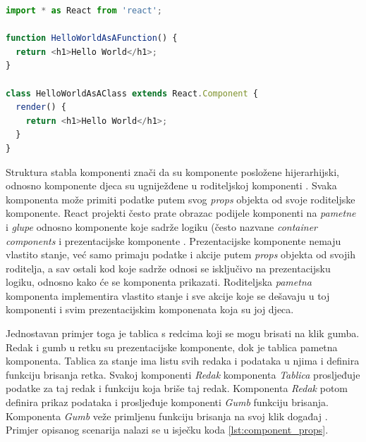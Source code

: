 \documentclass[times, utf8, diplomski, numeric]{fer}
\newcommand{\razmakp}{\vspace{18pt}}
\newcommand{\razmaks}{\vspace{10pt}}
\begin{document}
\razmakp %
\begin{lstlisting}[language=JavaScript, caption={Primjer funkcijske i razredne komponente}, label={lst:component}]
import * as React from 'react';

function HelloWorldAsAFunction() {
  return <h1>Hello World</h1>;
}

class HelloWorldAsAClass extends React.Component {
  render() {
    return <h1>Hello World</h1>;
  }
}
\end{lstlisting}
\razmaks

Struktura stabla komponenti znači da su komponente posložene hijerarhijski, odnosno komponente djeca  su ugniježđene u roditeljskoj komponenti .
Svaka komponenta može primiti podatke putem svog \emph{props} objekta od svoje roditeljske komponente\citep{react_docs}.
React projekti često prate obrazac podijele komponenti na \emph{pametne} i \emph{glupe} odnosno komponente koje sadrže logiku (često nazvane \emph{container components} i prezentacijske komponente .
Prezentacijske komponente nemaju vlastito stanje, već samo primaju podatke i akcije putem \emph{props} objekta od svojih roditelja, a sav ostali kod koje sadrže odnosi se isključivo na prezentacijsku logiku, odnosno kako će se komponenta prikazati. Roditeljska \emph{pametna} komponenta implementira vlastito stanje i sve akcije koje se dešavaju u toj komponenti i svim prezentacijskim komponenata koja su joj djeca\citep{med_comp}.

Jednostavan primjer toga je tablica s redcima koji se mogu brisati na klik gumba.
Redak i gumb u retku su prezentacijske komponente, dok je tablica pametna komponenta.
Tablica za stanje ima listu svih redaka i podataka u njima i definira funkciju brisanja retka.
Svakoj komponenti \emph{Redak} komponenta \emph{Tablica} prosljeđuje podatke za taj redak i funkciju koja briše taj redak.
Komponenta \emph{Redak} potom definira prikaz podataka i prosljeđuje komponenti \emph{Gumb} funkciju brisanja.
Komponenta \emph{Gumb} veže primljenu funkciju brisanja na svoj klik događaj .
Primjer opisanog scenarija nalazi se u isječku koda \ref{lst:component_props}.
\end{document}
